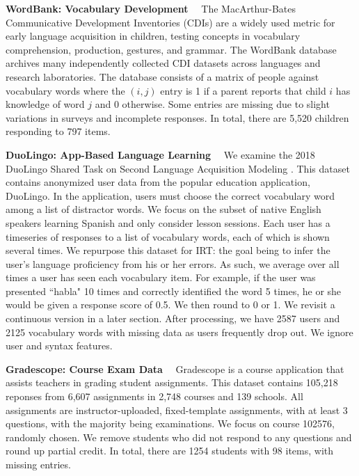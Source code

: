 \noindent\textbf{WordBank: Vocabulary Development}$\quad$
The MacArthur-Bates Communicative Development Inventories (CDIs) are a widely used metric for early language acquisition in children, testing concepts in vocabulary comprehension, production, gestures, and grammar.
The WordBank \cite{frank2017wordbank} database archives many independently collected CDI datasets across languages and research laboratories.
The database consists of a matrix of people against vocabulary words where the $(i,j)$ entry is 1 if a parent reports that child $i$ has knowledge of word $j$ and 0 otherwise.
Some entries are missing due to slight variations in surveys and incomplete responses.
In total, there are 5,520 children responding to 797 items.\newline

\noindent\textbf{DuoLingo: App-Based Language Learning}$\quad$
We examine the 2018 DuoLingo Shared Task on Second Language Acquisition Modeling \cite{settles2018second}.
This dataset contains anonymized user data from the popular education application, DuoLingo.
In the application, users must choose the correct vocabulary word among a list of distractor words.
We focus on the subset of native English speakers learning Spanish and only consider lesson sessions.
Each user has a timeseries of responses to a list of vocabulary words, each of which is shown several times.
We repurpose this dataset for IRT: the goal being to infer the user's language proficiency from his or her errors.
As such, we average over all times a user has seen each vocabulary item.
For example, if the user was presented ``habla" 10 times and correctly identified the word 5 times, he or she would be given a response score of 0.5.
We then round
to 0 or 1.
We revisit a continuous version in a later section.
After processing, we have 2587 users and 2125 vocabulary words with missing data as users frequently drop out.
We ignore user and syntax features.\newline

\noindent\textbf{Gradescope: Course Exam Data}$\quad$
Gradescope \cite{singh2017gradescope} is a course application that assists teachers in grading student assignments.
This dataset contains 105,218 reponses from 6,607 assignments in 2,748 courses and 139 schools.
All assignments are instructor-uploaded, fixed-template assignments, with at least 3 questions, with the majority being examinations.
We focus on course 102576, randomly chosen.
We remove students who did not respond to any questions and round up partial credit.
In total, there are 1254 students with 98 items, with missing entries.\newline

